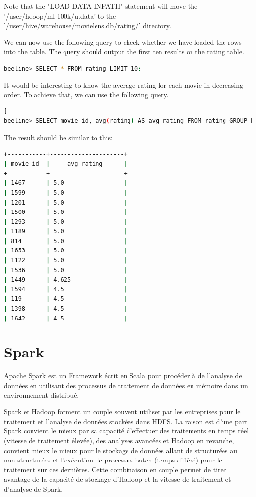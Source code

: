 \documentclass[12pt,english]{book}
\begin{document}
Note that the "LOAD DATA INPATH" statement will move the '/user/hdoop/ml-100k/u.data' to the '/user/hive/warehouse/movielens.db/rating/' directory.

We can now use the following query to check whether we have loaded the rows into the table.
The query should output the first ten results or the rating table.

\begin{lstlisting}[language=bash, frame=single, basicstyle=\footnotesize]
beeline> SELECT * FROM rating LIMIT 10;
\end{lstlisting}

It would be interesting to know the average rating for each movie in decreasing order.
To achieve that, we can use the following query.

\begin{lstlisting}[language=bash, frame=single, basicstyle=\footnotesize, breaklines=true, postbreak=\mbox{\textcolor{red}{$\hookrightarrow$}\space}]]
beeline> SELECT movie_id, avg(rating) AS avg_rating FROM rating GROUP BY movie_id ORDER BY avg_rating DESC;
\end{lstlisting}

The result should be similar to this:

\begin{lstlisting}[language=bash, frame=single, basicstyle=\footnotesize]
+-----------+---------------------+
| movie_id  |     avg_rating      |
+-----------+---------------------+
| 1467      | 5.0                 |
| 1599      | 5.0                 |
| 1201      | 5.0                 |
| 1500      | 5.0                 |
| 1293      | 5.0                 |
| 1189      | 5.0                 |
| 814       | 5.0                 |
| 1653      | 5.0                 |
| 1122      | 5.0                 |
| 1536      | 5.0                 |
| 1449      | 4.625               |
| 1594      | 4.5                 |
| 119       | 4.5                 |
| 1398      | 4.5                 |
| 1642      | 4.5                 |
\end{lstlisting}

\section{Spark}

Apache Spark est un Framework écrit en Scala pour procéder à de l’analyse de données en utilisant des processus de traitement de données en mémoire dans un environnement distribué.

Spark et Hadoop forment un couple souvent utiliser par les entreprises pour le traitement et l’analyse de données stockées dans HDFS. La raison est d’une part Spark convient le mieux par sa capacité d’effectuer des traitements en temps réel (vitesse de traitement élevée), des analyses avancées et Hadoop en revanche, convient mieux le mieux pour le stockage de données allant de structurées au non-structurées et l’exécution de processus batch (temps différé) pour le traitement sur ces dernières.
Cette combinaison en couple permet de tirer avantage de la capacité de stockage d’Hadoop et la vitesse de traitement et d’analyse de Spark.    
\end{document}

